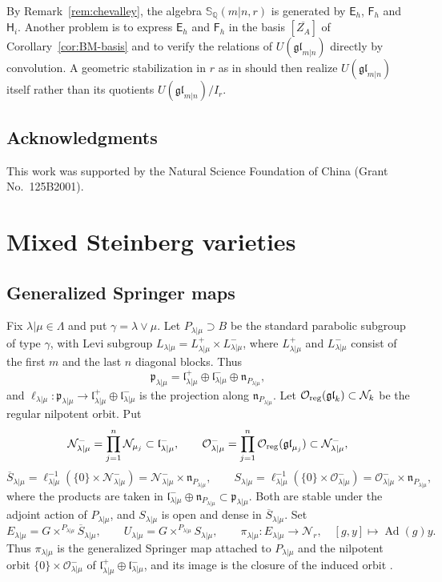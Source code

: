 \documentclass[11pt,a4paper]{amsart}
\theoremstyle{definition}
\theoremstyle{remark}
\newcommand{\Q}{\mathbb Q}
\newcommand{\N}{\mathcal N}
\newcommand{\bS}{\mathbb S}
\newcommand{\Ad}{\operatorname{Ad}}
\newcommand{\lm}{\lambda|\mu}
\numberwithin{equation}{section}
\begin{document}
By Remark~\ref{rem:chevalley}, the algebra $\bS_\Q(m|n,r)$ is generated by
$\mathsf E_h$, $\mathsf F_h$ and $\mathsf H_i$. Another problem is to
express $\mathsf E_h$ and $\mathsf F_h$ in the basis $[\overline{Z_A}]$ of
Corollary~\ref{cor:BM-basis} and to verify the relations of
$U(\mathfrak{gl}_{m|n})$ directly by convolution. A geometric
stabilization in $r$ as in \cite{BLM} should then realize
$U(\mathfrak{gl}_{m|n})$ itself rather than its quotients
$U(\mathfrak{gl}_{m|n})/I_r$.

\subsection*{Acknowledgments}
This work was supported by the Natural Science Foundation of
China (Grant No.~125B2001).


\section{Mixed Steinberg varieties}
\label{sec:geometry}

\subsection{Generalized Springer maps}
\label{sec:spaces}

Fix $\lm\in\Lambda$ and put $\gamma=\lambda\vee\mu$. Let
$P_{\lm}\supset B$ be the standard parabolic subgroup of type $\gamma$,
with Levi subgroup $L_{\lm}=L_{\lm}^+\times L_{\lm}^-$, where $L_{\lm}^+$
and $L_{\lm}^-$ consist of the first $m$ and the last $n$ diagonal
blocks. Thus
$$
\mathfrak p_{\lm}=\mathfrak l_{\lm}^+\oplus\mathfrak l_{\lm}^-
\oplus\mathfrak n_{P_{\lm}},
$$
and $\ell_{\lm}:\mathfrak p_{\lm}\to\mathfrak l_{\lm}^+\oplus\mathfrak l_{\lm}^-$
is the projection along $\mathfrak n_{P_{\lm}}$. Let
$\mathcal O_{\rm reg}(\mathfrak{gl}_k)\subset\N_k$ be the regular nilpotent
orbit. Put
$$
\N_{\lm}^-=\prod_{j=1}^n\N_{\mu_j}\subset\mathfrak l_{\lm}^-,\qquad
\mathcal O_{\lm}^-=\prod_{j=1}^n\mathcal O_{\rm reg}(\mathfrak{gl}_{\mu_j})
\subset\N_{\lm}^-,
$$
\begin{equation}\label{eq:S-lm}
\overline S_{\lm}=\ell_{\lm}^{-1}(\{0\}\times\N_{\lm}^-)
=\N_{\lm}^-\times\mathfrak n_{P_{\lm}},\qquad
S_{\lm}=\ell_{\lm}^{-1}(\{0\}\times\mathcal O_{\lm}^-)
=\mathcal O_{\lm}^-\times\mathfrak n_{P_{\lm}},
\end{equation}
where the products are taken in
$\mathfrak l_{\lm}^-\oplus\mathfrak n_{P_{\lm}}\subset\mathfrak p_{\lm}$. Both
are stable under the adjoint action of $P_{\lm}$, and $S_{\lm}$ is open
and dense in $\overline S_{\lm}$. Set
$$
E_{\lm}=G\times^{P_{\lm}}\overline S_{\lm},\qquad
U_{\lm}=G\times^{P_{\lm}}S_{\lm},\qquad
\pi_{\lm}:E_{\lm}\to\N_r,\quad[g,y]\mapsto\Ad(g)y.
$$
Thus $\pi_{\lm}$ is the generalized Springer map attached to $P_{\lm}$ and
the nilpotent orbit $\{0\}\times\mathcal O_{\lm}^-$ of
$\mathfrak l_{\lm}^+\oplus\mathfrak l_{\lm}^-$, and its image is the closure
of the induced orbit \cite[Chapter~7]{CM}.
\end{document}

